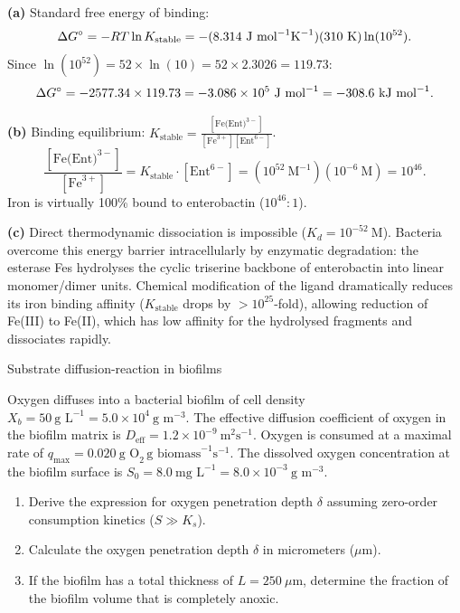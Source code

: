 \documentclass[12pt, a4paper, oneside]{report}
\begin{document}
\begin{solution}
  \textbf{(a)} Standard free energy of binding:
  \[
    \Delta G^{\circ} = -RT \ln K_{\text{stable}} = -(8.314~\text{J~mol}^{-1}\text{K}^{-1})(310~\text{K}) \ln(10^{52}).
  \]
  Since $\ln(10^{52}) = 52 \times \ln(10) = 52 \times 2.3026 = 119.73$:
  \[
    \Delta G^{\circ} = -2577.34 \times 119.73 = -3.086 \times 10^5~\text{J~mol}^{-1} = -308.6~\text{kJ~mol}^{-1}.
  \]

  \textbf{(b)} Binding equilibrium: $K_{\text{stable}} = \frac{[\text{Fe(Ent)}^{3-}]}{[\text{Fe}^{3+}][\text{Ent}^{6-}]}$.
  \[
    \frac{[\text{Fe(Ent)}^{3-}]}{[\text{Fe}^{3+}]} = K_{\text{stable}} \cdot [\text{Ent}^{6-}] = (10^{52}~\text{M}^{-1})(10^{-6}~\text{M}) = 10^{46}.
  \]
  Iron is virtually 100\% bound to enterobactin ($10^{46}:1$).

  \textbf{(c)} Direct thermodynamic dissociation is impossible ($K_d = 10^{-52}~\text{M}$). Bacteria overcome this energy barrier intracellularly by enzymatic degradation: the esterase Fes hydrolyses the cyclic triserine backbone of enterobactin into linear monomer/dimer units. Chemical modification of the ligand dramatically reduces its iron binding affinity ($K_{\text{stable}}$ drops by $> 10^{25}$-fold), allowing reduction of Fe(III) to Fe(II), which has low affinity for the hydrolysed fragments and dissociates rapidly.
\end{solution}

\begin{problem}{\enspace{}\enspace
  Substrate diffusion-reaction in biofilms}

  Oxygen diffuses into a bacterial biofilm of cell density $X_b = 50~\text{g~L}^{-1} = 5.0 \times 10^4~\text{g~m}^{-3}$. The effective diffusion coefficient of oxygen in the biofilm matrix is $D_{\text{eff}} = 1.2 \times 10^{-9}~\text{m}^2\text{s}^{-1}$. Oxygen is consumed at a maximal rate of $q_{\max} = 0.020~\text{g~O}_2\,\text{g biomass}^{-1}\text{s}^{-1}$. The dissolved oxygen concentration at the biofilm surface is $S_0 = 8.0~\text{mg~L}^{-1} = 8.0 \times 10^{-3}~\text{g~m}^{-3}$.

  \begin{enumerate}
    \item Derive the expression for oxygen penetration depth $\delta$ assuming zero-order consumption kinetics ($S \gg K_s$).
    \item Calculate the oxygen penetration depth $\delta$ in micrometers ($\mu\text{m}$).
    \item If the biofilm has a total thickness of $L = 250~\mu\text{m}$, determine the fraction of the biofilm volume that is completely anoxic.
  \end{enumerate}
\end{problem}
\end{document}

